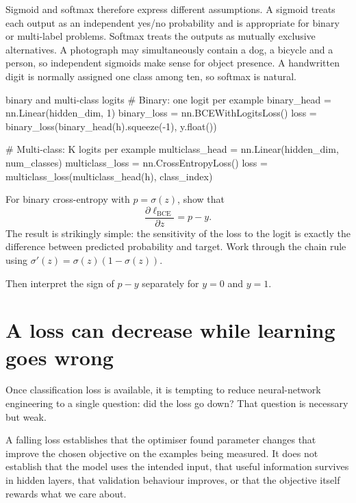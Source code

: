 Sigmoid and softmax therefore express different assumptions. A sigmoid treats each output as an independent yes/no probability and is appropriate for binary or multi-label problems. Softmax treats the outputs as mutually exclusive alternatives. A photograph may simultaneously contain a dog, a bicycle and a person, so independent sigmoids make sense for object presence. A handwritten digit is normally assigned one class among ten, so softmax is natural.

\begin{pytorchbox}{binary and multi-class logits}
# Binary: one logit per example
binary_head = nn.Linear(hidden_dim, 1)
binary_loss = nn.BCEWithLogitsLoss()
loss = binary_loss(binary_head(h).squeeze(-1), y.float())

# Multi-class: K logits per example
multiclass_head = nn.Linear(hidden_dim, num_classes)
multiclass_loss = nn.CrossEntropyLoss()
loss = multiclass_loss(multiclass_head(h), class_index)
\end{pytorchbox}

\begin{optionalexercise}[title={Optional mathematics --- the clean gradient hidden inside BCE}]
For binary cross-entropy with \(p=\sigma(z)\), show that
\[
  \frac{\partial \ell_{\mathrm{BCE}}}{\partial z}=p-y.
\]
The result is strikingly simple: the sensitivity of the loss to the logit is exactly the difference between predicted probability and target. Work through the chain rule using \(\sigma'(z)=\sigma(z)(1-\sigma(z))\).

Then interpret the sign of \(p-y\) separately for \(y=0\) and \(y=1\).
\end{optionalexercise}

\section{A loss can decrease while learning goes wrong}

Once classification loss is available, it is tempting to reduce neural-network engineering to a single question: did the loss go down? That question is necessary but weak.

A falling loss establishes that the optimiser found parameter changes that improve the chosen objective on the examples being measured. It does not establish that the model uses the intended input, that useful information survives in hidden layers, that validation behaviour improves, or that the objective itself rewards what we care about.

